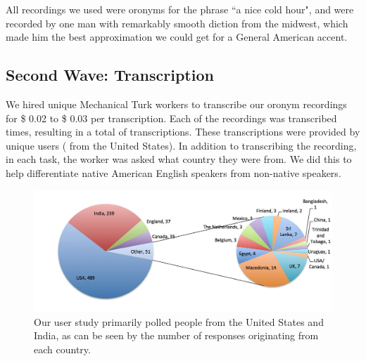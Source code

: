 All \recordingsPhaseTwoUserStudy recordings we used were oronyms for the phrase ``a nice cold hour", and were recorded by one man with remarkably smooth diction from the midwest, which made him the best approximation we could get for a General American accent.

\subsection{Second Wave: Transcription}
\label{subsection:secondWaveUserStudy}

We hired \uniqueUsersPhaseTwoUserStudy unique Mechanical Turk workers to transcribe our oronym recordings for \$ 0.02 to \$ 0.03 per transcription.  Each of the \recordingsPhaseTwoUserStudy recordings was transcribed \numTranscriptionsPerRecordingPhaseTwoUserStudy times, resulting in a total of \numResponsesPhaseTwoUserStudy transcriptions. These transcriptions were provided by \uniqueUsersPhaseTwoUserStudy unique users ( \uniqueUsersPhaseTwoUserStudyUSA from the United States). In addition to transcribing the recording, in each task, the worker was asked what country they were from. We did this to help differentiate native American English speakers from non-native speakers.

\begin{figure}
\includegraphics[width=150mm]{responsesPerCountry.jpg}
\captionfonts
\caption[Responses Per Country]{ Our user study primarily polled people from the United States and India, as can be seen by the number of responses originating from each country. }
\label{fig:responsesPerCountry}
\end{figure}

